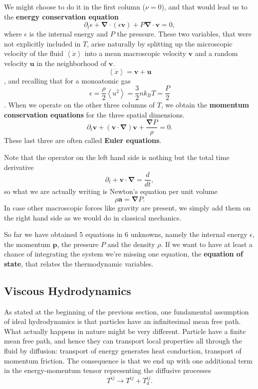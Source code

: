 We might choose to do it in the first column ($\nu=0$), and that would lead us to the \textbf{energy conservation equation}
\begin{equation} \label{consen}
	\partial_t \epsilon + \mathbf{ \nabla} \cdot (\epsilon \mathbf{v}) + P\mathbf{ \nabla} \cdot \mathbf{v}=0,
\end{equation}
where $\epsilon$ is the internal energy and $P$ the pressure. These two variables, that were not explicitly included in $T$, arise naturally by splitting up the microscopic velocity of the fluid $\left <  \dot{x} \right >$ into a mean macroscopic velocity $\mathbf{v}$ and a random velocity $\mathbf{u}$ in the neighborhood of $\mathbf{v}$. 
$$\left <  \dot{x} \right >= \mathbf{v}  +  \mathbf{u} $$,
and recalling that for a monoatomic gas
$$\epsilon = \frac{\rho}{2} \left <  u^2 \right > = \frac{3}{2} n k_B T= \frac{P}{2}$$.
When we operate on the other three columns of $T$, we obtain the \textbf{momentum conservation equations} for the three spatial dimensions.
\begin{equation} \label{euler}
	\partial_t \mathbf{v} + (\mathbf{v} \cdot \mathbf{\nabla}) \mathbf{v} + \frac{\mathbf{ \nabla} P}{\rho}=0.
\end{equation}
These last three are often called \textbf{Euler equations}. 

Note that the operator on the left hand side is nothing but the total time derivative
$$
\partial_t + \mathbf{v} \cdot \mathbf{ \nabla} = \frac{d}{dt},
$$
so what we are actually writing is Newton's equation per unit volume
$$
\rho \mathbf{a} = \mathbf{\nabla} P.
$$
In case other macroscopic forces like gravity are present, we simply add them on the right hand side as we would do in classical mechanics. 

So far we have obtained 5 equations in 6 unknowns, namely the internal energy $\epsilon$, the momentum $\mathbf{p}$, the pressure $P$ and the density $\rho$. If we want to have at least a chance of integrating the system we're missing one equation, the \textbf{equation of state}, that relates the thermodynamic variables.

\subsection{Viscous Hydrodynamics}

As stated at the beginning of the previous section, one fundamental assumption of ideal hydrodynamics is that particles have an infinitesimal mean free path. What actually happens in nature might be very different. Particle have a finite mean free path, and hence they can transport local properties all through the fluid by diffusion: transport of energy generates heat conduction, transport of momentum friction. The consequence is that we end up with one additional term in the energy-momentum tensor representing the diffusive processes
$$
T^{ij} \to T^{ij} + T^{ij}_d .
$$

